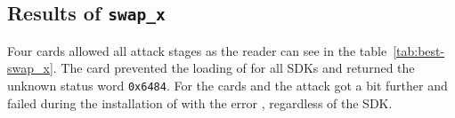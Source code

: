 \documentclass{../llncs/llncs}
\begin{document}





            


        \subsection{Results of \texttt{swap_x}}\label{subsec:swapx}

            Four cards allowed all attack stages as the reader can see in the table~\ref{tab:best-swap_x}.
            The card \Gcard prevented the loading of \vulnscap for all SDKs and returned the unknown status word \texttt{0x6484}. For the cards \Ccard and \Icard the attack got a bit further and failed during the installation of \vulnscap with the error \shortswconditionsnotsatisfied, regardless of the SDK.
\end{document}
